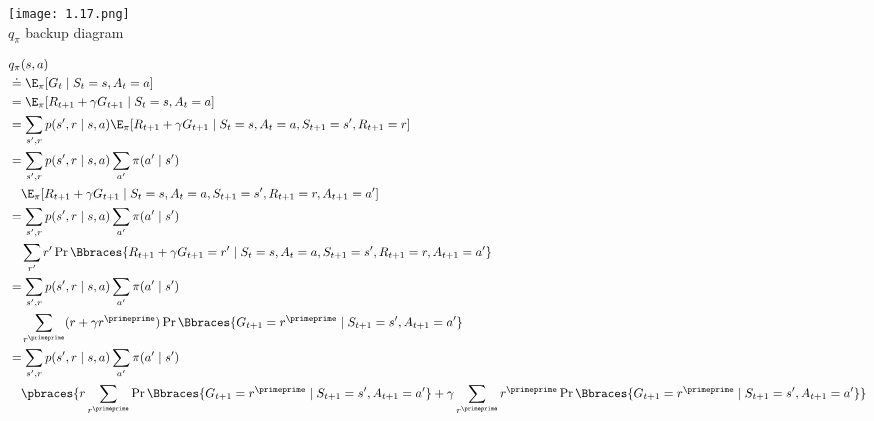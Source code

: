 \begin{solution}

\phantom{}

\begin{center}
    \texttt{[image: 1.17.png]} \\
    $q_\pi$ backup diagram
\end{center}

\begin{align*}
    &
    q_\pi(s, a) \\
    & \doteq
    \E_\pi [G_t \mid S_t = s, A_t = a] \\
    & =
    \E_\pi [R_{t+1} + \gamma G_{t+1} \mid S_t = s, A_t = a] \\
    & =
    \sum_{s^\prime, r}
        p(s^\prime, r \mid s, a)
        \E_\pi[R_{t+1} + \gamma G_{t+1} \mid S_t = s, A_t = a, S_{t+1} = s^\prime, R_{t+1} = r] \\
    & =
    \sum_{s^\prime, r}
        p(s^\prime, r \mid s, a)
        \sum_{a^\prime}
            \pi(a^\prime \mid s^\prime) \\ & \quad
            \E_\pi[R_{t+1} + \gamma G_{t+1} \mid S_t = s, A_t = a, S_{t+1} = s^\prime, R_{t+1} = r, A_{t+1} = a^\prime] \\
    & =
    \sum_{s^\prime, r}
        p(s^\prime, r \mid s, a)
        \sum_{a^\prime}
            \pi(a^\prime \mid s^\prime) \\ & \quad
            \sum_{r^\prime}
                r^\prime
                \Pr \Bbraces{R_{t+1} + \gamma G_{t+1} = r^\prime \mid S_t = s, A_t = a, S_{t+1} = s^\prime, R_{t+1} = r, A_{t+1} = a^\prime} \\
    & =
    \sum_{s^\prime, r}
        p(s^\prime, r \mid s, a)
        \sum_{a^\prime}
            \pi(a^\prime \mid s^\prime) \\ & \quad
            \sum_{r^\primeprime}
                (r + \gamma r^\primeprime)
                \Pr \Bbraces{G_{t+1} = r^\primeprime \mid S_{t+1} = s^\prime, A_{t+1} = a^\prime} \\
    & =
    \sum_{s^\prime, r}
        p(s^\prime, r \mid s, a)
        \sum_{a^\prime}
            \pi(a^\prime \mid s^\prime) \\ & \quad
            \pbraces
            {
                r
                \sum_{r^\primeprime}
                    \Pr \Bbraces{G_{t+1} = r^\primeprime \mid S_{t+1} = s^\prime, A_{t+1} = a^\prime}
                +
                \gamma 
                \sum_{r^\primeprime}
                    r^\primeprime
                    \Pr \Bbraces{G_{t+1} = r^\primeprime \mid S_{t+1} = s^\prime, A_{t+1} = a^\prime}
}
\end{align*}
\end{solution}
